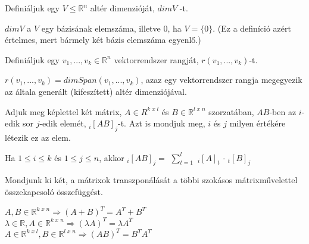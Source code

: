 \begin{frame}
  \begin{tcolorbox}[title={10}]
     Definiáljuk egy $V \leq \mathbb{R}^n$ altér dimenzióját, $dimV$ -t.

  \tcblower
$dimV$ a $V$ egy bázisának elemszáma, illetve 0, ha $V = \{0\}$. (Ez a definíció azért értelmes, mert bármely két bázis elemszáma egyenlő.)

  \end{tcolorbox}
\end{frame}



\begin{frame}
  \begin{tcolorbox}[title={11}]
   Definiáljuk egy $v_1,...,v_k \in \mathbb{R}^n$ vektorrendszer rangját, $r(v_1,...,v_k)$-t.


  \tcblower
$r(v_1,...,v_k) = dimSpan(v_1,...,v_k)$, azaz egy vektorrendszer rangja megegyezik az általa generált (kifeszített) altér dimenziójával.

  \end{tcolorbox}
\end{frame}


\begin{frame}
  \begin{tcolorbox}[title={12}]
    Adjuk meg képlettel két mátrix, $A \in R^{k \; x \; l}$ és $B \in \mathbb{R}^{l \; x \; n}$ szorzatában, $AB$-ben az $i$-edik sor $j$-edik elemét, $_{i} [AB]_j$-t. Azt is mondjuk meg, $i$ és $j$ milyen értékére létezik ez az elem.



  \tcblower
Ha $1 \leq i \leq k$ és $1 \leq j \leq n$, akkor $_{i} [AB]_j =$ $\sum_{t = 1}^l$ $_{i} [A]_t$ $\cdot$ $_{t} [B]_j$
  \end{tcolorbox}
\end{frame}



\begin{frame}
  \begin{tcolorbox}[title={13}]
    Mondjunk ki két, a mátrixok transzponálását a többi szokásos mátrixművelettel összekapcsoló összefüggést.

  \tcblower
$A,B \in \mathbb{R}^{k \; x \; n} {\Rightarrow} (A + B)^T = A^T + B^T$\\
${\lambda} \in \mathbb{R},A \in \mathbb{R}^{k \; x \; n} {\Rightarrow} ({\lambda}A)^T = {\lambda}A^T$\\
$A \in \mathbb{R}^{k \; x \; l}, B \in \mathbb{R}^{l \; x \; n} {\Rightarrow} (AB)^T = B^TA^T$

  \end{tcolorbox}
\end{frame}



